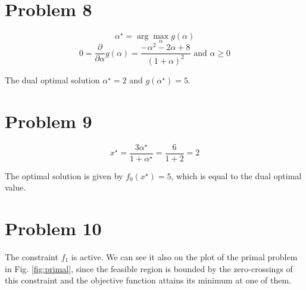 \documentclass[12pt]{article}
\begin{document}
\section*{Problem 8}

\begin{equation}
 \alpha^\star = \arg \max_\alpha g(\alpha) 
\end{equation}
\begin{equation}
 0 = \frac{\partial}{\partial \alpha} g(\alpha) = \frac{- \alpha^2 - 2 \alpha +8}{(1 + \alpha)^2} \text{ and } \alpha \geq 0
\end{equation}

The dual optimal solution $\alpha^\star = 2$ and $g(\alpha^\star) = 5$.

\section*{Problem 9}

\begin{equation}
 x^\star = \frac{3 \alpha^\star}{1 + \alpha^\star} = \frac{6}{1 + 2} = 2
\end{equation}

The optimal solution is given by $f_0(x^\star) = 5$, which is equal to the dual optimal value.

\section*{Problem 10}

The constraint $f_1$ is active. We can see it also on the plot of the primal problem in Fig. \ref{fig:primal}, since the feasible region is bounded by the zero-crossings of this constraint and the objective function attains its minimum at one of them.

  
\end{document}
